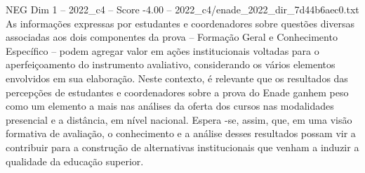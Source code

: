 \begin{textsample}{NEG Dim 1 – 2022\_c4 – Score -4.00 – 2022\_c4/enade\_2022\_dir\_7d44b6aec0.txt}
As informações expressas por estudantes e coordenadores sobre questões diversas associadas aos dois componentes da prova – Formação Geral e Conhecimento Específico – podem agregar valor em ações institucionais voltadas para o aperfeiçoamento do instrumento avaliativo, considerando os vários elementos envolvidos em sua elaboração.
Neste contexto, é relevante que os resultados das percepções de estudantes e coordenadores sobre a prova do Enade ganhem peso como um elemento a mais nas análises da oferta dos cursos nas modalidades presencial e a distância, em nível nacional.
Espera -se, assim, que, em uma visão formativa de avaliação, o conhecimento e a análise desses resultados possam vir a contribuir para a construção de alternativas institucionais que venham a induzir a qualidade da educação superior.

\end{textsample}

